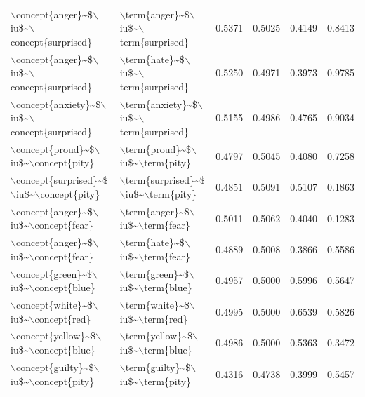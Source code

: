 \begin{table}[ht]
\begin{tabular}{llrrrr}
  $\backslash$concept\{anger\}\~{}\$$\backslash$iu\$\~{}$\backslash$concept\{surprised\} & $\backslash$term\{anger\}\~{}\$$\backslash$iu\$\~{}$\backslash$term\{surprised\} & 0.5371 & 0.5025 & 0.4149 & 0.8413 \\ 
  $\backslash$concept\{anger\}\~{}\$$\backslash$iu\$\~{}$\backslash$concept\{surprised\} & $\backslash$term\{hate\}\~{}\$$\backslash$iu\$\~{}$\backslash$term\{surprised\} & 0.5250 & 0.4971 & 0.3973 & 0.9785 \\ 
  $\backslash$concept\{anxiety\}\~{}\$$\backslash$iu\$\~{}$\backslash$concept\{surprised\} & $\backslash$term\{anxiety\}\~{}\$$\backslash$iu\$\~{}$\backslash$term\{surprised\} & 0.5155 & 0.4986 & 0.4765 & 0.9034 \\ 
  $\backslash$concept\{proud\}\~{}\$$\backslash$iu\$\~{}$\backslash$concept\{pity\} & $\backslash$term\{proud\}\~{}\$$\backslash$iu\$\~{}$\backslash$term\{pity\} & 0.4797 & 0.5045 & 0.4080 & 0.7258 \\ 
  $\backslash$concept\{surprised\}\~{}\$$\backslash$iu\$\~{}$\backslash$concept\{pity\} & $\backslash$term\{surprised\}\~{}\$$\backslash$iu\$\~{}$\backslash$term\{pity\} & 0.4851 & 0.5091 & 0.5107 & 0.1863 \\ 
  $\backslash$concept\{anger\}\~{}\$$\backslash$iu\$\~{}$\backslash$concept\{fear\} & $\backslash$term\{anger\}\~{}\$$\backslash$iu\$\~{}$\backslash$term\{fear\} & 0.5011 & 0.5062 & 0.4040 & 0.1283 \\ 
  $\backslash$concept\{anger\}\~{}\$$\backslash$iu\$\~{}$\backslash$concept\{fear\} & $\backslash$term\{hate\}\~{}\$$\backslash$iu\$\~{}$\backslash$term\{fear\} & 0.4889 & 0.5008 & 0.3866 & 0.5586 \\ 
  $\backslash$concept\{green\}\~{}\$$\backslash$iu\$\~{}$\backslash$concept\{blue\} & $\backslash$term\{green\}\~{}\$$\backslash$iu\$\~{}$\backslash$term\{blue\} & 0.4957 & 0.5000 & 0.5996 & 0.5647 \\ 
  $\backslash$concept\{white\}\~{}\$$\backslash$iu\$\~{}$\backslash$concept\{red\} & $\backslash$term\{white\}\~{}\$$\backslash$iu\$\~{}$\backslash$term\{red\} & 0.4995 & 0.5000 & 0.6539 & 0.5826 \\ 
  $\backslash$concept\{yellow\}\~{}\$$\backslash$iu\$\~{}$\backslash$concept\{blue\} & $\backslash$term\{yellow\}\~{}\$$\backslash$iu\$\~{}$\backslash$term\{blue\} & 0.4986 & 0.5000 & 0.5363 & 0.3472 \\ 
  $\backslash$concept\{guilty\}\~{}\$$\backslash$iu\$\~{}$\backslash$concept\{pity\} & $\backslash$term\{guilty\}\~{}\$$\backslash$iu\$\~{}$\backslash$term\{pity\} & 0.4316 & 0.4738 & 0.3999 & 0.5457 \\ 

\end{tabular}
\end{table}
